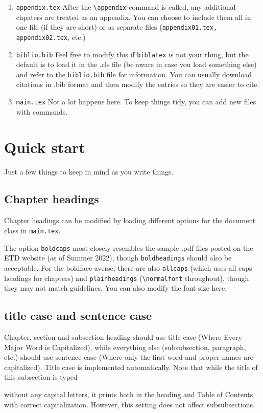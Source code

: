 \begin{enumerate}
\item \texttt{appendix.tex} After the \verb|\appendix| command is called, any additional chpaters are treated as an appendix. You can choose to include them all in one file (if they are short) or as separate files (\texttt{appendix01.tex, appendix02.tex}, etc.)
\item \texttt{biblio.bib} Feel free to modify this if \texttt{biblatex} is not your thing, but the default is to load it in the .cls file (be aware in case you load something else) and refer to the \texttt{biblio.bib} file for information. You can usually download citations in .bib format and then modify the entries so they are easier to cite. 
\item \texttt{main.tex} Not a lot happens here. To keep things tidy, you can add new files with \verb|| commands.
\end{enumerate}

\section{Quick start}
Just a few things to keep in mind as you write things. 
\subsection{Chapter headings}
Chapter headings can be modified by loading different options for the document class in \texttt{main.tex}.



The option \texttt{boldcaps} most closely resembles the sample .pdf files posted on the ETD website (as of Summer 2022), though \texttt{boldheadings} should also be acceptable. For the boldface averse, there are also \texttt{allcaps} (which uses all caps headings for chapters) and \texttt{plainheadings} (\verb|\normalfont| throughout), though they may not match guidelines. You can also modify the font size here. 

\subsection{title case and sentence case}
Chapter, section and subsection heading should use title case (Where Every Major Word is Capitalized), while everything else (subsubsection, paragraph, etc.) should use sentence case (Where only the first word and proper names are capitalized). Title case is implemented automatically. Note that while the title of this subsection is typed

without any capital letters, it prints both in the heading and Table of Contents with correct capitalization. However, this setting does not affect subsubsections.

